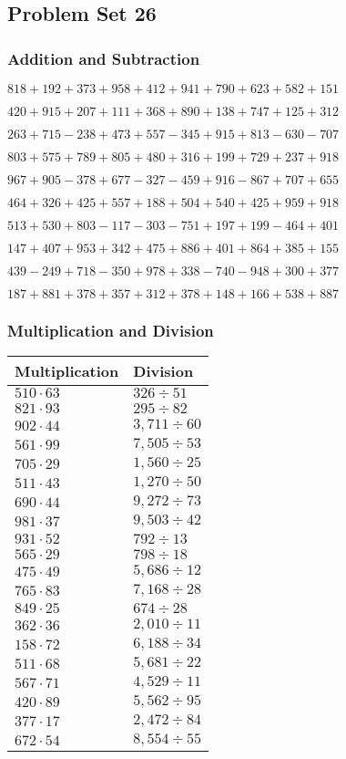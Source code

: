 \hypertarget{problem-set-26-2}{%
\subsection{Problem Set 26}\label{problem-set-26-2}}

\hypertarget{addition-and-subtraction-126}{%
\subsubsection{Addition and
Subtraction}\label{addition-and-subtraction-126}}

\(818 + 192 + 373 + 958 + 412 + 941 + 790 + 623 + 582 + 151\)

\(420 + 915 + 207 + 111 + 368 + 890 + 138 + 747 + 125 + 312\)

\(263 + 715 - 238 + 473 + 557 - 345 + 915 + 813 - 630 - 707\)

\(803 + 575 + 789 + 805 + 480 + 316 + 199 + 729 + 237 + 918\)

\(967 + 905 - 378 + 677 - 327 - 459 + 916 - 867 + 707 + 655\)

\(464 + 326 + 425 + 557 + 188 + 504 + 540 + 425 + 959 + 918\)

\(513 + 530 + 803 - 117 - 303 - 751 + 197 + 199 - 464 + 401\)

\(147 + 407 + 953 + 342 + 475 + 886 + 401 + 864 + 385 + 155\)

\(439 - 249 + 718 - 350 + 978 + 338 - 740 - 948 + 300 + 377\)

\(187 + 881 + 378 + 357 + 312 + 378 + 148 + 166 + 538 + 887\)

\hypertarget{multiplication-and-division-126}{%
\subsubsection{Multiplication and
Division}\label{multiplication-and-division-126}}

\begin{longtable}[]{@{}ll@{}}
\toprule
Multiplication & Division\tabularnewline
\midrule
\endhead
\(510 \cdot 63\) & \(326 ÷51\)\tabularnewline
\(821 \cdot 93\) & \(295÷82\)\tabularnewline
\(902 \cdot 44\) & \(3,711÷60\)\tabularnewline
\(561 \cdot 99\) & \(7,505÷53\)\tabularnewline
\(705 \cdot 29\) & \(1,560÷25\)\tabularnewline
\(511 \cdot 43\) & \(1,270÷50\)\tabularnewline
\(690 \cdot 44\) & \(9,272÷73\)\tabularnewline
\(981 \cdot 37\) & \(9,503÷42\)\tabularnewline
\(931 \cdot 52\) & \(792÷13\)\tabularnewline
\(565 \cdot 29\) & \(798÷18\)\tabularnewline
\(475 \cdot 49\) & \(5,686÷12\)\tabularnewline
\(765 \cdot 83\) & \(7,168÷28\)\tabularnewline
\(849 \cdot 25\) & \(674÷28\)\tabularnewline
\(362 \cdot 36\) & \(2,010÷11\)\tabularnewline
\(158 \cdot 72\) & \(6,188÷34\)\tabularnewline
\(511 \cdot 68\) & \(5,681÷22\)\tabularnewline
\(567 \cdot 71\) & \(4,529÷11\)\tabularnewline
\(420 \cdot 89\) & \(5,562÷95\)\tabularnewline
\(377 \cdot 17\) & \(2,472÷84\)\tabularnewline
\(672 \cdot 54\) & \(8,554÷55\)\tabularnewline
\bottomrule
\end{longtable}

